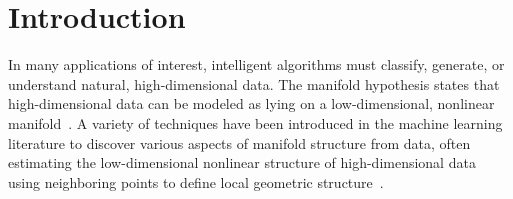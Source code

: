 \documentclass[letterpaper]{article} %
\begin{document}
\section{Introduction}
In many applications of interest, intelligent algorithms must classify, generate, or understand natural, high-dimensional data. The manifold hypothesis states that high-dimensional data can be modeled as lying on a low-dimensional, nonlinear manifold~\cite{fefferman2016testing}. A variety of techniques have been introduced in the machine learning literature to discover various aspects of manifold structure from data, often estimating the low-dimensional nonlinear structure of high-dimensional data using neighboring points to define local geometric structure~\cite{tenenbaum2000global,roweis2000nonlinear,dollar2007learning,bengio2005non,rao1999learning,miao2007learning,culpepper2009learning}.
\end{document}
